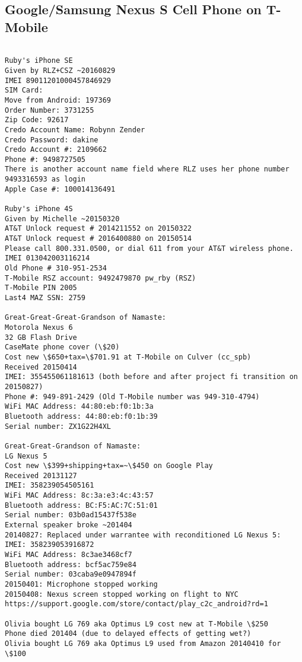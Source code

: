 \documentclass[12pt,twoside]{article}
\begin{document}
\subsection{Google/Samsung Nexus S Cell Phone on T-Mobile}\label{sxn:namaste}
\begin{verbatim}

Ruby's iPhone SE
Given by RLZ+CSZ ~20160829
IMEI 89011201000457846929
SIM Card: 
Move from Android: 197369
Order Number: 3731255
Zip Code: 92617
Credo Account Name: Robynn Zender
Credo Password: dakine
Credo Account #: 2109662
Phone #: 9498727505
There is another account name field where RLZ uses her phone number 9493316593 as login
Apple Case #: 100014136491

Ruby's iPhone 4S
Given by Michelle ~20150320
AT&T Unlock request # 2014211552 on 20150322
AT&T Unlock request # 2016400880 on 20150514
Please call 800.331.0500, or dial 611 from your AT&T wireless phone. 
IMEI 013042003116214
Old Phone # 310-951-2534
T-Mobile RSZ account: 9492479870 pw_rby (RSZ)
T-Mobile PIN 2005
Last4 MAZ SSN: 2759

Great-Great-Great-Grandson of Namaste:
Motorola Nexus 6
32 GB Flash Drive
CaseMate phone cover (\$20)
Cost new \$650+tax=\$701.91 at T-Mobile on Culver (cc_spb)
Received 20150414
IMEI: 355455061181613 (both before and after project fi transition on 20150827)
Phone #: 949-891-2429 (Old T-Mobile number was 949-310-4794)
WiFi MAC Address: 44:80:eb:f0:1b:3a
Bluetooth address: 44:80:eb:f0:1b:39
Serial number: ZX1G22H4XL

Great-Great-Grandson of Namaste:
LG Nexus 5
Cost new \$399+shipping+tax=~\$450 on Google Play
Received 20131127
IMEI: 358239054505161
WiFi MAC Address: 8c:3a:e3:4c:43:57
Bluetooth address: BC:F5:AC:7C:51:01
Serial number: 03b0ad15437f538e
External speaker broke ~201404
20140827: Replaced under warrantee with reconditioned LG Nexus 5:
IMEI: 358239053916872
WiFi MAC Address: 8c3ae3468cf7
Bluetooth address: bcf5ac759e84
Serial number: 03caba9e0947894f
20150401: Microphone stopped working
20150408: Nexus screen stopped working on flight to NYC
https://support.google.com/store/contact/play_c2c_android?rd=1

Olivia bought LG 769 aka Optimus L9 cost new at T-Mobile \$250
Phone died 201404 (due to delayed effects of getting wet?)
Olivia bought LG 769 aka Optimus L9 used from Amazon 20140410 for \$100


\end{verbatim}
\end{document}
